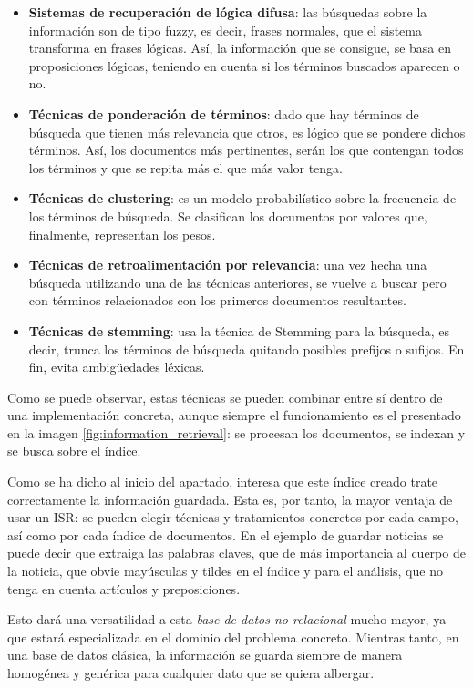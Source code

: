 \begin{itemize}
    \item \textbf{Sistemas de recuperación de lógica difusa}: las búsquedas sobre la información son de tipo fuzzy, es decir, frases normales, que el sistema transforma en frases lógicas. Así, la información que se consigue, se basa en proposiciones lógicas, teniendo en cuenta si los términos buscados aparecen o no.
    \item \textbf{Técnicas de ponderación de términos}: dado que hay términos de búsqueda que tienen más relevancia que otros, es lógico que se pondere dichos términos. Así, los documentos más pertinentes, serán los que contengan todos los términos y que se repita más el que más valor tenga.
    \item \textbf{Técnicas de clustering}: es un modelo probabilístico sobre la frecuencia de los términos de búsqueda. Se clasifican los documentos por valores que, finalmente, representan los pesos.
    \item \textbf{Técnicas de retroalimentación por relevancia}: una vez hecha una búsqueda utilizando una de las técnicas anteriores, se vuelve a buscar pero con términos relacionados con los primeros documentos resultantes.
    \item \textbf{Técnicas de stemming}: usa la técnica de Stemming para la búsqueda, es decir, trunca los términos de búsqueda quitando posibles prefijos o sufijos. En fin, evita ambigüedades léxicas.
\end{itemize}

Como se puede observar, estas técnicas se pueden combinar entre sí dentro de una implementación concreta, aunque siempre el funcionamiento es el presentado en la imagen \ref{fig:information_retrieval}: se procesan los documentos, se indexan y se busca sobre el índice.

Como se ha dicho al inicio del apartado, interesa que este índice creado trate correctamente la información guardada. Esta es, por tanto, la mayor ventaja de usar un ISR: se pueden elegir técnicas y tratamientos concretos por cada campo, así como por cada índice de documentos. En el ejemplo de guardar noticias se puede decir que extraiga las palabras claves, que de más importancia al cuerpo de la noticia, que obvie mayúsculas y tildes en el índice y para el análisis, que no tenga en cuenta artículos y preposiciones.

Esto dará una versatilidad a esta \textit{base de datos no relacional} mucho mayor, ya que estará especializada en el dominio del problema concreto. Mientras tanto, en una base de datos clásica, la información se guarda siempre de manera homogénea y genérica para cualquier dato que se quiera albergar.


